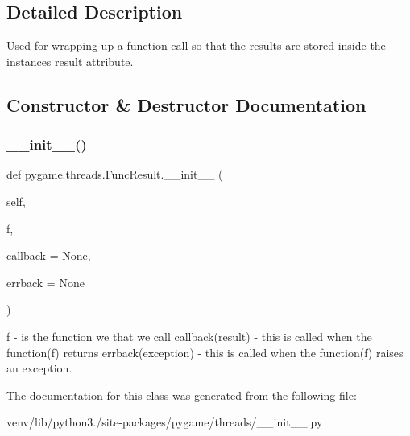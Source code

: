 \subsection{Detailed Description}
\begin{DoxyVerb}Used for wrapping up a function call so that the results are stored
     inside the instances result attribute.
\end{DoxyVerb}
 

\subsection{Constructor \& Destructor Documentation}
\mbox{\label{classpygame_1_1threads_1_1_func_result_a61e36edc69a58ba0101f7bf1930d62d0}} 
\subsubsection{\texorpdfstring{\+\_\+\+\_\+init\+\_\+\+\_\+()}{\_\_init\_\_()}}
{\footnotesize\ttfamily def pygame.\+threads.\+Func\+Result.\+\_\+\+\_\+init\+\_\+\+\_\+ (\begin{DoxyParamCaption}\item[{}]{self,  }\item[{}]{f,  }\item[{}]{callback = {\ttfamily None},  }\item[{}]{errback = {\ttfamily None} }\end{DoxyParamCaption})}

\begin{DoxyVerb}f - is the function we that we call 
    callback(result) - this is called when the function(f) returns
    errback(exception) - this is called when the function(f) raises
                   an exception.
\end{DoxyVerb}
 

The documentation for this class was generated from the following file\+:\begin{DoxyCompactItemize}
\item 
venv/lib/python3./site-\/packages/pygame/threads/\+\_\+\+\_\+init\+\_\+\+\_\+.\+py\end{DoxyCompactItemize}
